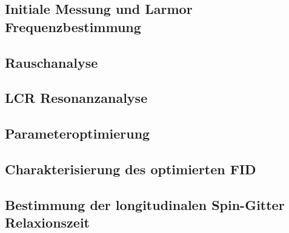 \documentclass[../main.tex]{subfiles}
\begin{document}
    
    \subsection{Initiale Messung und Larmor Frequenzbestimmung}\label{subsec:2:InitialeMessung}
        

    \subsection{Rauschanalyse}\label{subsec:3:Rauschanalyse}
        

    \subsection{LCR Resonanzanalyse}\label{subsec:4:LCRResonanzanalyse}
        

    \subsection{Parameteroptimierung}\label{subsec:5:Parameteroptimierung}
        



\subsection{Charakterisierung des optimierten FID} %
    
     
    


    \subsection{Bestimmung der longitudinalen Spin-Gitter Relaxionszeit}\label{subsec:8:BestimmungDerLongitudinalenSpinGitterRelaxionszeit}
        
\end{document}

